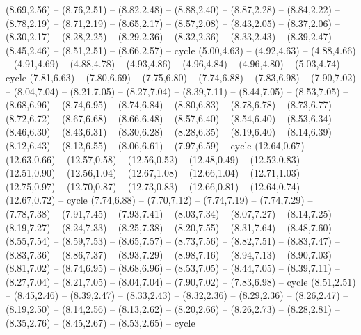 \expandafter\def\csname geo:gebiet:MCO\endcsname{
  }
\expandafter\def\csname geo:gebiet:MLT\endcsname{
  }
\expandafter\def\csname geo:gebiet:MKD\endcsname{
  (8.69,2.56) -- (8.76,2.51) -- (8.82,2.48) -- (8.88,2.40) -- (8.87,2.28) -- (8.84,2.22) -- (8.78,2.19) -- (8.71,2.19) -- (8.65,2.17) -- (8.57,2.08) -- (8.43,2.05) -- (8.37,2.06) -- (8.30,2.17) -- (8.28,2.25) -- (8.29,2.36) -- (8.32,2.36) -- (8.33,2.43) -- (8.39,2.47) -- (8.45,2.46) -- (8.51,2.51) -- (8.66,2.57) -- cycle}
\expandafter\def\csname geo:gebiet:LUX\endcsname{
  (5.00,4.63) -- (4.92,4.63) -- (4.88,4.66) -- (4.91,4.69) -- (4.88,4.78) -- (4.93,4.86) -- (4.96,4.84) -- (4.96,4.80) -- (5.03,4.74) -- cycle}
\expandafter\def\csname geo:gebiet:LTU\endcsname{
  (7.81,6.63) -- (7.80,6.69) -- (7.75,6.80) -- (7.74,6.88) -- (7.83,6.98) -- (7.90,7.02) -- (8.04,7.04) -- (8.21,7.05) -- (8.27,7.04) -- (8.39,7.11) -- (8.44,7.05) -- (8.53,7.05) -- (8.68,6.96) -- (8.74,6.95) -- (8.74,6.84) -- (8.80,6.83) -- (8.78,6.78) -- (8.73,6.77) -- (8.72,6.72) -- (8.67,6.68) -- (8.66,6.48) -- (8.57,6.40) -- (8.54,6.40) -- (8.53,6.34) -- (8.46,6.30) -- (8.43,6.31) -- (8.30,6.28) -- (8.28,6.35) -- (8.19,6.40) -- (8.14,6.39) -- (8.12,6.43) -- (8.12,6.55) -- (8.06,6.61) -- (7.97,6.59) -- cycle}
\expandafter\def\csname geo:gebiet:LIE\endcsname{
  }
\expandafter\def\csname geo:gebiet:LBN\endcsname{
  (12.64,0.67) -- (12.63,0.66) -- (12.57,0.58) -- (12.56,0.52) -- (12.48,0.49) -- (12.52,0.83) -- (12.51,0.90) -- (12.56,1.04) -- (12.67,1.08) -- (12.66,1.04) -- (12.71,1.03) -- (12.75,0.97) -- (12.70,0.87) -- (12.73,0.83) -- (12.66,0.81) -- (12.64,0.74) -- (12.67,0.72) -- cycle}
\expandafter\def\csname geo:gebiet:LVA\endcsname{
  (7.74,6.88) -- (7.70,7.12) -- (7.74,7.19) -- (7.74,7.29) -- (7.78,7.38) -- (7.91,7.45) -- (7.93,7.41) -- (8.03,7.34) -- (8.07,7.27) -- (8.14,7.25) -- (8.19,7.27) -- (8.24,7.33) -- (8.25,7.38) -- (8.20,7.55) -- (8.31,7.64) -- (8.48,7.60) -- (8.55,7.54) -- (8.59,7.53) -- (8.65,7.57) -- (8.73,7.56) -- (8.82,7.51) -- (8.83,7.47) -- (8.83,7.36) -- (8.86,7.37) -- (8.93,7.29) -- (8.98,7.16) -- (8.94,7.13) -- (8.90,7.03) -- (8.81,7.02) -- (8.74,6.95) -- (8.68,6.96) -- (8.53,7.05) -- (8.44,7.05) -- (8.39,7.11) -- (8.27,7.04) -- (8.21,7.05) -- (8.04,7.04) -- (7.90,7.02) -- (7.83,6.98) -- cycle}
\expandafter\def\csname geo:gebiet:KOS\endcsname{
  (8.51,2.51) -- (8.45,2.46) -- (8.39,2.47) -- (8.33,2.43) -- (8.32,2.36) -- (8.29,2.36) -- (8.26,2.47) -- (8.19,2.50) -- (8.14,2.56) -- (8.13,2.62) -- (8.20,2.66) -- (8.26,2.73) -- (8.28,2.81) -- (8.35,2.76) -- (8.45,2.67) -- (8.53,2.65) -- cycle}
